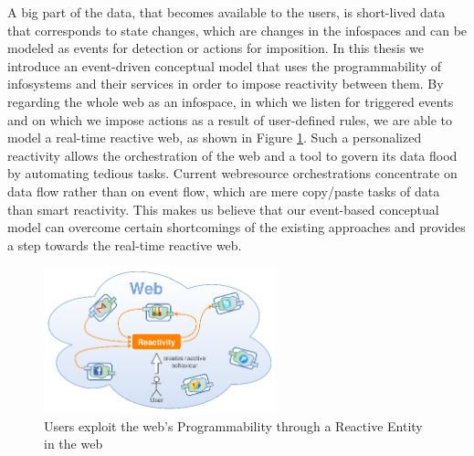 A big part of the data, that becomes available to the users, is short-lived data that corresponds to state changes, which are changes in the \textrm{\glspl{infospace}} and can be modeled as events for detection or actions for imposition.
In this thesis we introduce an event-driven conceptual model that uses the programmability of \textrm{\glspl{infosystem}} and their services in order to impose reactivity between them.
By regarding the whole \textrm{\gls{web}} as an \textrm{\gls{infospace}}, in which we listen for triggered events and on which we impose actions as a result of user-defined rules, we are able to model a real-time reactive \textrm{\gls{web}}, as shown in Figure \ref{fig:UsersWeildServicesInTheWeb}.
Such a personalized reactivity allows the orchestration of the \textrm{\gls{web}} and a tool to govern its data flood by automating tedious tasks.
Current \textrm{\gls{webresource}} orchestrations concentrate on data flow rather than on event flow, which are mere copy/paste tasks of data than smart reactivity.
This makes us believe that our event-based conceptual model can overcome certain shortcomings of the existing approaches and provides a step towards the real-time reactive \textrm{\gls{web}}.


\begin{figure}[!ht]
  \centering
  \includegraphics[width=0.6\textwidth]{figures/ReactivityOnTheWeb}
  \caption{Users exploit the \textrm{\gls{web}}'s Programmability through a Reactive Entity in the \textrm{\gls{web}}}
  \label{fig:UsersWeildServicesInTheWeb}
\end{figure}



